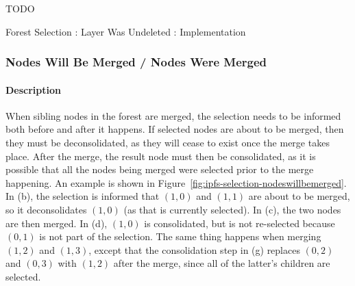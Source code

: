 TODO

\begin{stulisting}[p]
\caption{Forest Selection : Layer Was Undeleted : Implementation}
\label{code:ipfs-selection-layerwasundeleted}

\end{stulisting}

\afterpage{\clearpage}
\newpage

\subsubsection{Nodes Will Be Merged / Nodes Were Merged}

\paragraph{Description}

When sibling nodes in the forest are merged, the selection needs to be informed both before and after it happens. If selected nodes are about to be merged, then they must be deconsolidated, as they will cease to exist once the merge takes place. After the merge, the result node must then be consolidated, as it is possible that all the nodes being merged were selected prior to the merge happening. An example is shown in Figure~\ref{fig:ipfs-selection-nodeswillbemerged}. In (b), the selection is informed that $(1,0)$ and $(1,1)$ are about to be merged, so it deconsolidates $(1,0)$ (as that is currently selected). In (c), the two nodes are then merged. In (d), $(1,0)$ is consolidated, but is not re-selected because $(0,1)$ is not part of the selection. The same thing happens when merging $(1,2)$ and $(1,3)$, except that the consolidation step in (g) replaces $(0,2)$ and $(0,3)$ with $(1,2)$ after the merge, since all of the latter's children are selected.

